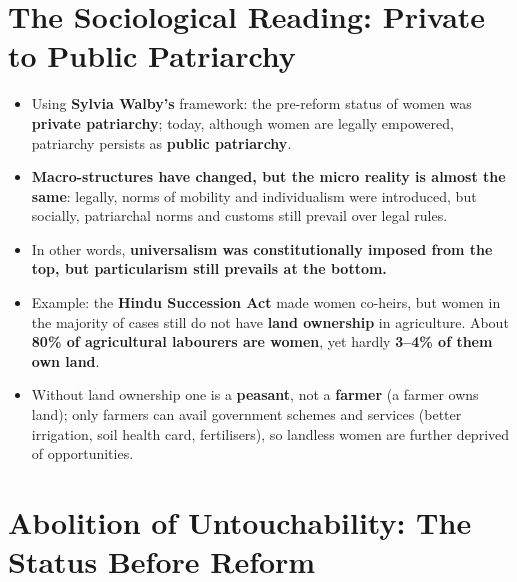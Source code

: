 \section{The Sociological Reading: Private to Public Patriarchy}

\begin{KeyConcept}
\begin{itemize}
\item Using \textbf{Sylvia Walby's} framework: the pre-reform status of women was \textbf{private patriarchy}; today, although women are legally empowered, patriarchy persists as \textbf{public patriarchy}.
\item \textbf{Macro-structures have changed, but the micro reality is almost the same}: legally, norms of mobility and individualism were introduced, but socially, patriarchal norms and customs still prevail over legal rules.
\item In other words, \textbf{universalism was constitutionally imposed from the top, but particularism still prevails at the bottom.}
\end{itemize}
\end{KeyConcept}

\begin{ExampleBox}
\begin{itemize}
\item Example: the \textbf{Hindu Succession Act} made women co-heirs, but women in the majority of cases still do not have \textbf{land ownership} in agriculture. About \textbf{80\% of agricultural labourers are women}, yet hardly \textbf{3--4\% of them own land}.
\item Without land ownership one is a \textbf{peasant}, not a \textbf{farmer} (a farmer owns land); only farmers can avail government schemes and services (better irrigation, soil health card, fertilisers), so landless women are further deprived of opportunities.
\end{itemize}
\end{ExampleBox}

\section{Abolition of Untouchability: The Status Before Reform}

